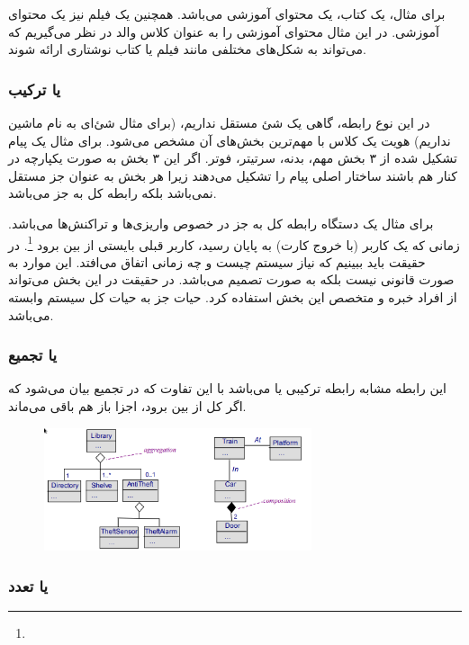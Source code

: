 برای مثال، یک کتاب، یک محتوای آموزشی می‌باشد. همچنین یک فیلم نیز یک محتوای
آموزشی. در این مثال محتوای آموزشی را به عنوان کلاس والد در نظر می‌گیریم که
می‌تواند به شکل‌های مختلفی مانند فیلم یا کتاب نوشتاری ارائه شوند.

\subsubsection{ یا ترکیب}

در این نوع رابطه، گاهی یک شئ مستقل نداریم، (برای مثال شئ‌ای به نام ماشین نداریم)
هویت یک کلاس با مهم‌ترین بخش‌های آن مشخص می‌شود. برای مثال یک پیام تشکیل شده از
۳ بخش مهم، بدنه، سرتیتر، فوتر. اگر این ۳ بخش به صورت یکپارچه در کنار هم باشند
ساختار اصلی پیام را تشکیل می‌دهند زیرا هر بخش به عنوان جز مستقل نمی‌باشد بلکه
رابطه کل به جز می‌باشد.

برای مثال  یک دستگاه  رابطه کل به جز در خصوص واریزی‌ها و
تراکنش‌ها می‌باشد. زمانی که  یک کاربر (با خروج کارت) به پایان رسید،
 کاربر قبلی بایستی از بین برود \footnote{}. در حقیقت
باید ببینیم که نیاز سیستم چیست و چه زمانی اتفاق می‌افتد. این موارد به صورت
قانونی نیست بلکه به صورت تصمیم می‌باشد. در حقیقت در این بخش می‌تواند از افراد
خبره و متخصص این بخش استفاده کرد. حیات جز به حیات کل سیستم وابسته می‌باشد.

\subsubsection{ یا تجمیع}

این رابطه مشابه رابطه ترکیبی یا  می‌باشد با این تفاوت که در
تجمیع بیان می‌شود که اگر کل از بین برود، اجزا باز هم باقی می‌ماند.

\begin{figure}[H]
    \centering
    \includegraphics[width=0.7\textwidth]{images/aggregation_relation.png}
    \caption{}
\end{figure}

\subsubsection{ یا تعدد}

